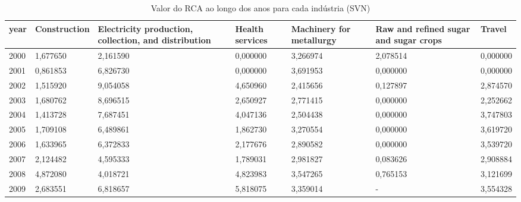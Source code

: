 \begin{table}
\centering
\caption{Valor do RCA ao longo dos anos para cada indústria (SVN)}
\begin{tabular}{p{1cm}p{2cm}p{2cm}p{2cm}p{2cm}p{2cm}p{2cm}}
\toprule
 year &  Construction &  Electricity production, collection, and distribution &  Health services &  Machinery for metallurgy &  Raw and refined sugar and sugar crops &   Travel \\
\midrule
 2000 &      1,677650 &                                           2,161590 &         0,000000 &                  3,266974 &                               2,078514 & 0,000000 \\
 2001 &      0,861853 &                                           6,826730 &         0,000000 &                  3,691953 &                               0,000000 & 0,000000 \\
 2002 &      1,515920 &                                           9,054058 &         4,650960 &                  2,415656 &                               0,127897 & 2,874570 \\
 2003 &      1,680762 &                                           8,696515 &         2,650927 &                  2,771415 &                               0,000000 & 2,252662 \\
 2004 &      1,413728 &                                           7,687451 &         4,047136 &                  2,504438 &                               0,000000 & 3,747803 \\
 2005 &      1,709108 &                                           6,489861 &         1,862730 &                  3,270554 &                               0,000000 & 3,619720 \\
 2006 &      1,633965 &                                           6,372833 &         2,177676 &                  2,890582 &                               0,000000 & 3,539720 \\
 2007 &      2,124482 &                                           4,595333 &         1,789031 &                  2,981827 &                               0,083626 & 2,908884 \\
 2008 &      4,872080 &                                           4,018721 &         4,823983 &                  3,547265 &                               0,765153 & 3,121699 \\
 2009 &      2,683551 &                                           6,818657 &         5,818075 &                  3,359014 &                                      - & 3,554328 \\

\end{tabular}
\end{table}
